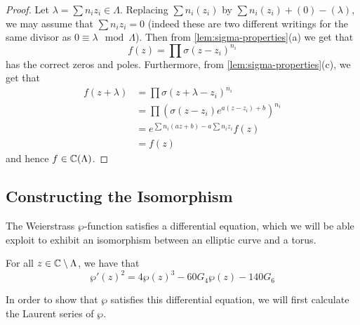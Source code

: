 \begin{proof}
	Let $\lambda = \sum n_i z_i \in \Lambda$.
	Replacing $\sum n_i(z_i)$ by $\sum n_i(z_i) + (0) - (\lambda)$,
	we may assume
	that $\sum n_iz_i = 0$ (indeed these are two different writings
	for the same divisor as $0 \equiv \lambda \mod \Lambda$).
	Then from \ref{lem:sigma-properties}(a) we get that
	\begin{equation*}
		f(z) = \prod \sigma(z - z_i)^{n_i}
	\end{equation*}
	has the correct zeros and poles.
	Furthermore, from \ref{lem:sigma-properties}(c),
	we get that
	\begin{align*}
		f(z + \lambda) &= \prod \sigma(z + \lambda - z_i)^{n_i}\\
		&= \prod \left(\sigma(z - z_i)e^{a(z - z_i) + b}\right)^{n_i}\\
		&= e^{\sum n_i(az + b) - a\sum n_iz_i} f(z)\\
		&= f(z)
	\end{align*}
	and hence $f \in \mathbb{C}(\Lambda)$.
\end{proof}

\subsection{Constructing the Isomorphism}

The Weierstrass $\wp$-function satisfies a differential equation, which we
will be able exploit to exhibit an isomorphism between an elliptic curve
and a torus.

\begin{proposition}
	\label{prop:diffeq}
	For all $z \in \mathbb{C} \setminus \Lambda$, we have that
	\begin{equation*}
		\wp'(z)^2 = 4\wp(z)^3 - 60G_4\wp(z) - 140G_6
	\end{equation*}
\end{proposition}

In order to show that $\wp$ satisfies this differential equation,
we will first calculate the Laurent series of $\wp$.

